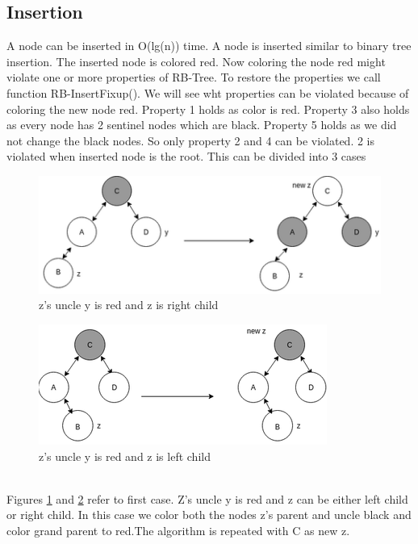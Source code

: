 \documentclass[BTech]{iitmdiss}
\begin{document}
\subsection{Insertion}
A node can be inserted in O(lg(n)) time. A node is inserted similar to binary tree insertion. The inserted node is colored red. Now coloring the node red might violate one or more properties of RB-Tree. To restore the properties we call function RB-InsertFixup(). We will see wht properties can be violated because of coloring the new node red. Property 1 holds as color is red. Property 3 also holds as every node has 2 sentinel nodes which are black. Property 5 holds as we did not change the black nodes. So only property 2 and 4 can be violated. 2 is violated when inserted node is the root. This can be divided into 3 cases\\
\begin{figure}[h]
    \centering
    \centerline{\includegraphics{rsz_cse1.png}}
    \caption{z's uncle y  is red and z is right child}
    \label{fig:case1.1}
\end{figure}
\begin{figure}[h]
    \centering
    \centerline{\includegraphics{rsz_case1.png}}
    \caption{z's uncle y is red and z is left child}
    \label{fig:case1.2}
\end{figure}\\
Figures \ref{fig:case1.1} and \ref{fig:case1.2} refer to first case. Z's uncle y is red and z can be either left child or right child. In this case we color both the nodes z's parent and uncle black and color grand parent to red.The algorithm is repeated with C as new z.\\
\end{document}

